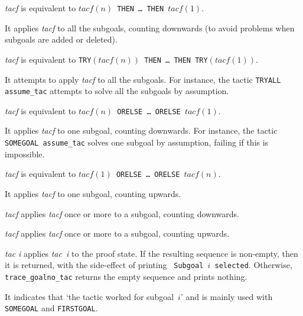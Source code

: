 \begin{ttdescription}
\item[\ttindexbold{ALLGOALS} {\it tacf}] 
is equivalent to
\hbox{\tt$tacf(n)$ THEN \ldots{} THEN $tacf(1)$}.  

It applies {\it tacf} to all the subgoals, counting downwards (to
avoid problems when subgoals are added or deleted).

\item[\ttindexbold{TRYALL} {\it tacf}] 
is equivalent to
\hbox{\tt TRY$(tacf(n))$ THEN \ldots{} THEN TRY$(tacf(1))$}.  

It attempts to apply {\it tacf} to all the subgoals.  For instance,
the tactic \hbox{\tt TRYALL assume_tac} attempts to solve all the subgoals by
assumption.

\item[\ttindexbold{SOMEGOAL} {\it tacf}] 
is equivalent to
\hbox{\tt$tacf(n)$ ORELSE \ldots{} ORELSE $tacf(1)$}.  

It applies {\it tacf} to one subgoal, counting downwards.  For instance,
the tactic \hbox{\tt SOMEGOAL assume_tac} solves one subgoal by assumption,
failing if this is impossible.

\item[\ttindexbold{FIRSTGOAL} {\it tacf}] 
is equivalent to
\hbox{\tt$tacf(1)$ ORELSE \ldots{} ORELSE $tacf(n)$}.  

It applies {\it tacf} to one subgoal, counting upwards.

\item[\ttindexbold{REPEAT_SOME} {\it tacf}] 
applies {\it tacf} once or more to a subgoal, counting downwards.

\item[\ttindexbold{REPEAT_FIRST} {\it tacf}] 
applies {\it tacf} once or more to a subgoal, counting upwards.

\item[\ttindexbold{trace_goalno_tac} {\it tac} {\it i}] 
applies \hbox{\it tac i\/} to the proof state.  If the resulting sequence
is non-empty, then it is returned, with the side-effect of printing {\tt
Subgoal~$i$ selected}.  Otherwise, {\tt trace_goalno_tac} returns the empty
sequence and prints nothing.

It indicates that `the tactic worked for subgoal~$i$' and is mainly used
with {\tt SOMEGOAL} and {\tt FIRSTGOAL}.
\end{ttdescription}


